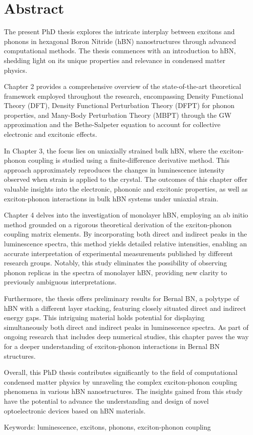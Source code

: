 \chapter*{Abstract}

The present PhD thesis explores the intricate interplay between excitons and phonons in hexagonal Boron Nitride (hBN) nanostructures through advanced computational methods. The thesis commences with an introduction to hBN, shedding light on its unique properties and relevance in condensed matter physics. 

Chapter 2 provides a comprehensive overview of the state-of-the-art theoretical framework employed throughout the research, encompassing Density Functional Theory (DFT), Density Functional Perturbation Theory (DFPT) for phonon properties, and Many-Body Perturbation Theory (MBPT) through the GW approximation and the Bethe-Salpeter equation to account for collective electronic and excitonic effects.

In Chapter 3, the focus lies on uniaxially strained bulk hBN, where the exciton-phonon coupling is studied using a finite-difference derivative method. This approach approximately reproduces the changes in luminescence intensity observed when strain is applied to the crystal. The outcomes of this chapter offer valuable insights into the electronic, phononic and excitonic properties, as well as exciton-phonon interactions in bulk hBN systems under uniaxial strain.

Chapter 4 delves into the investigation of monolayer hBN, employing an ab initio method grounded on a rigorous theoretical derivation of the exciton-phonon coupling matrix elements. By incorporating both direct and indirect peaks in the luminescence spectra, this method yields detailed relative intensities, enabling an accurate interpretation of experimental measurements published by different research groups. Notably, this study eliminates the possibility of observing phonon replicas in the spectra of monolayer hBN, providing new clarity to previously ambiguous interpretations.

Furthermore, the thesis offers preliminary results for Bernal BN, a polytype of hBN with a different layer stacking, featuring closely situated direct and indirect energy gaps. This intriguing material holds potential for displaying simultaneously both direct and indirect peaks in luminescence spectra. As part of ongoing research that includes deep numerical studies, this chapter paves the way for a deeper understanding of exciton-phonon interactions in Bernal BN structures.

Overall, this PhD thesis contributes significantly to the field of computational condensed matter physics by unraveling the complex exciton-phonon coupling phenomena in various hBN nanostructures. The insights gained from this study have the potential to advance the understanding and design of novel optoelectronic devices based on hBN materials.

\vspace{0.5cm}
Keywords: luminescence, excitons, phonons, exciton-phonon coupling


